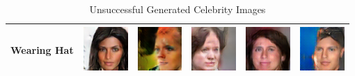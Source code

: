 \begin{table}[H]
\centering
\caption{Unsuccessful Generated Celebrity Images}
\label{U-celeb-a}
\begin{tabular}{|llllll|}
\hline
Wearing Hat & \includegraphics[width=1.69cm, height=1.69cm]{Files/images/images18/image1.png}  &\includegraphics[width=1.69cm, height=1.69cm]{Files/images/images18/image2.png}   & \includegraphics[width=1.69cm, height=1.69cm]{Files/images/images18/image3.png}  & \includegraphics[width=1.69cm, height=1.69cm]{Files/images/images18/image52.png}  & \includegraphics[width=1.69cm, height=1.69cm]{Files/images/images18/image68.png} \\ \hline



\end{tabular}
\end{table}
